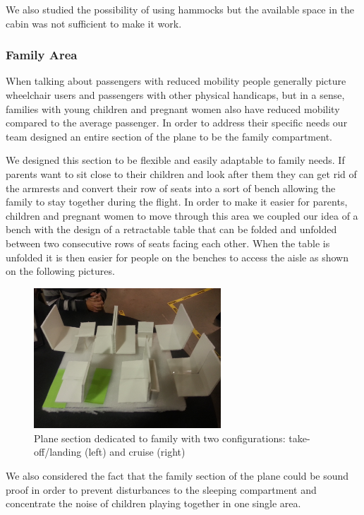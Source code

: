 We also studied the possibility of using hammocks but the available space in the cabin was not sufficient to make it work.

\subsubsection{Family Area}
When talking about passengers with reduced mobility people generally picture wheelchair users and passengers with other physical handicaps, but in a sense, families with young children and pregnant women also have reduced mobility compared to the average passenger. In order to address their specific needs our team designed an entire section of the plane to be the family compartment.

We designed this section to be flexible and easily adaptable to family needs. If parents want to sit close to their children and look after them they can get rid of the armrests and convert their row of seats into a sort of bench allowing the family to stay together during the flight. In order to make it easier for parents, children and pregnant women to move through this area we coupled our idea of a bench with the design of a retractable table that can be folded and unfolded between two consecutive rows of seats facing each other. When the table is unfolded it is then easier for people on the benches to access the aisle as shown on the following pictures. 

\begin{figure}[h]
  \centering
     \includegraphics[width=7cm]{images/20140116_173112.jpg}
   \caption{Plane section dedicated to family with two configurations: take-off/landing (left) and cruise (right)}
  \label{fig:20140116_173112}
\end{figure}

We also considered the fact that the family section of the plane could be sound proof in order to prevent disturbances to the sleeping compartment and concentrate the noise of children playing together in one single area.

